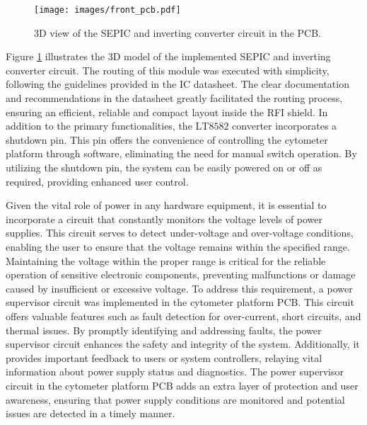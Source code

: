 \begin{figure}[!ht]
    \centering
    \texttt{[image: images/front\_pcb.pdf]}
    \caption{3D view of the SEPIC and inverting converter circuit in the PCB.}
    \label{figure:boost-pcb}
\end{figure}

Figure \ref{figure:boost-pcb} illustrates the \ac{3D} model of the implemented \ac{SEPIC} and inverting converter circuit. The routing of this module was executed with simplicity, following the guidelines provided in the \ac{IC} datasheet. The clear documentation and recommendations in the datasheet greatly facilitated the routing process, ensuring an efficient, reliable and compact layout inside the \ac{RFI} shield. In addition to the primary functionalities, the $\mathrm{LT8582}$ converter incorporates a shutdown pin. This pin offers the convenience of controlling the cytometer platform through software, eliminating the need for manual switch operation. By utilizing the shutdown pin, the system can be easily powered on or off as required, providing enhanced user control.


\noindent
Given the vital role of power in any hardware equipment, it is essential to incorporate a circuit that constantly monitors the voltage levels of power supplies. This circuit serves to detect under-voltage and over-voltage conditions, enabling the user to ensure that the voltage remains within the specified range. Maintaining the voltage within the proper range is critical for the reliable operation of sensitive electronic components, preventing malfunctions or damage caused by insufficient or excessive voltage. To address this requirement, a power supervisor circuit was implemented in the cytometer platform \ac{PCB}. This circuit offers valuable features such as fault detection for over-current, short circuits, and thermal issues. By promptly identifying and addressing faults, the power supervisor circuit enhances the safety and integrity of the system. Additionally, it provides important feedback to users or system controllers, relaying vital information about power supply status and diagnostics. The power supervisor circuit in the cytometer platform \ac{PCB} adds an extra layer of protection and user awareness, ensuring that power supply conditions are monitored and potential issues are detected in a timely manner.

